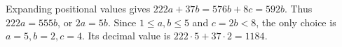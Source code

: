 Expanding positional values gives $222a+37b=576b+8c=592b$. Thus $222a=555b$, or $2a=5b$. Since $1\le a,b\le5$ and $c=2b<8$, the only choice is $a=5,b=2,c=4$. Its decimal value is $222\cdot5+37\cdot2=\boxed{1184}$.
